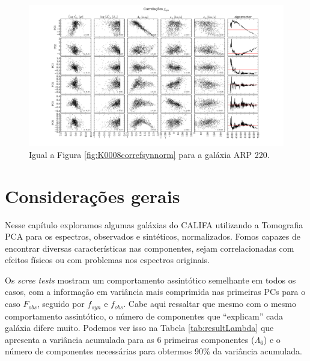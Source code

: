 \begin{figure}
    \includegraphics[width=1.2\textwidth, angle=-90]{figuras/K0802-correl-f_syn_norm-PCvsPhys.pdf}
	\caption[Correlações PCs vs. par\^ametros f\'isicos - $f_{syn}$ - ARP 220.]
	{Igual a Figura \ref{fig:K0008correfsynnorm} para a galáxia ARP 220.}
    \label{fig:K0802correfsynnorm}
\end{figure}

\section{Considerações gerais}

Nesse capítulo exploramos algumas galáxias do CALIFA utilizando a Tomografia PCA para os espectros, observados e
sintéticos, normalizados. Fomos capazes de encontrar diversas características nas componentes, sejam correlacionadas com
efeitos físicos ou com problemas nos espectros originais.

Os {\em scree tests} mostram um comportamento assintótico semelhante em todos os casos, com a informação em variância
mais comprimida nas primeiras PCs para o caso $F_{obs}$, seguido por $f_{syn}$ e $f_{obs}$. Cabe aqui ressaltar que mesmo com
o mesmo comportamento assintótico, o número de componentes que ``explicam'' cada galáxia difere muito. Podemos ver isso
na Tabela \ref{tab:resultLambda} que apresenta a variância acumulada para as 6 primeiras componentes ($\Lambda_6$) e o
número de componentes necessárias para obtermos 90\% da variância acumulada.

